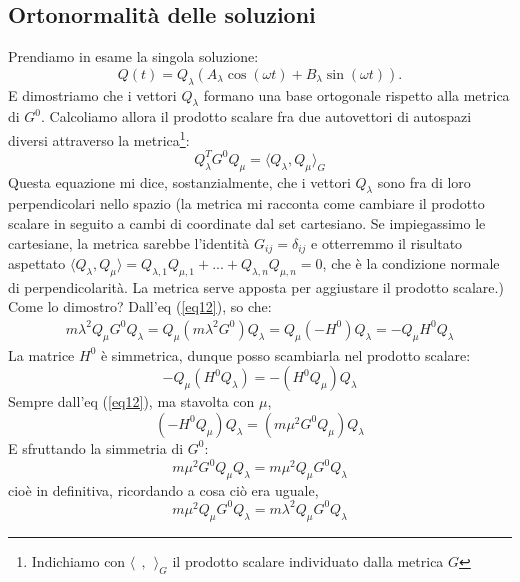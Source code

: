 \documentclass[a4paper,openany]{article}
\begin{document}
	\subsection{Ortonormalità delle soluzioni}
	Prendiamo in esame la singola soluzione:
	$$
	Q(t) = Q_{\lambda}(A_{\lambda}\cos(\omega t)+B_{\lambda}\sin(\omega t)).
	$$
	E dimostriamo che i vettori $Q_{\lambda}$ formano una base ortogonale rispetto alla metrica di $G^{0}$. Calcoliamo allora il prodotto scalare fra due autovettori di autospazi diversi attraverso la metrica\footnote{Indichiamo con $\langle \>\>,\>\>\rangle_{G}$ il prodotto scalare individuato dalla metrica $G$}:
	\begin{equation}\label{key}
		Q_{\lambda}^{T}G^{0}Q_{\mu} = \langle Q_{\lambda},Q_{\mu} \rangle_{G}
	\end{equation}
	Questa equazione mi dice, sostanzialmente, che i vettori $Q_{\lambda}$ sono fra di loro perpendicolari nello spazio (la metrica mi racconta come cambiare il prodotto scalare in seguito a cambi di coordinate dal set cartesiano. Se impiegassimo le cartesiane, la metrica sarebbe l'identità $G_{ij} = \delta_{ij}$ e otterremmo il risultato aspettato $\langle Q_{\lambda},Q_{\mu}\rangle = Q_{\lambda,1}Q_{\mu,1}+ ... + Q_{\lambda,n}Q_{\mu,n}=0$, che è la condizione normale di perpendicolarità. La metrica serve apposta per aggiustare il prodotto scalare.)
	Come lo dimostro?
	Dall'eq (\ref{eq12}), so che:
	\begin{equation}
		\begin{aligned}
			m\lambda^2 Q_{\mu} G^0 Q_{\lambda} =  Q_{\mu} (	m\lambda^2G^0) Q_{\lambda} = Q_{\mu}(-H^0)Q_{\lambda} =- Q_{\mu}H^0Q_{\lambda}
		\end{aligned}
	\end{equation}
	La matrice $H^0$ è simmetrica, dunque posso scambiarla nel prodotto scalare: 
	\begin{equation}\label{key}
		-Q_{\mu}(H^0Q_{\lambda}) = -(H^0 Q_{\mu})Q_{\lambda}
	\end{equation}
	Sempre dall'eq (\ref{eq12}), ma stavolta con $\mu$,
	\begin{equation}\label{key}
		(-H^0 Q_{\mu})Q_{\lambda} = (m\mu^2 G^{0}Q_{\mu})Q_{\lambda}
	\end{equation}
	E sfruttando la simmetria di $G^0$:
	\begin{equation}\label{key}
		m\mu^2 G^{0}Q_{\mu}Q_{\lambda} = m\mu^2 Q_{\mu}G^0Q_{\lambda}
	\end{equation}
	cioè in definitiva, ricordando a cosa ciò era uguale,
	$$
	m\mu^2 Q_{\mu}G^0Q_{\lambda} = 	m\lambda^2 Q_{\mu} G^0 Q_{\lambda}
	$$
\end{document}
